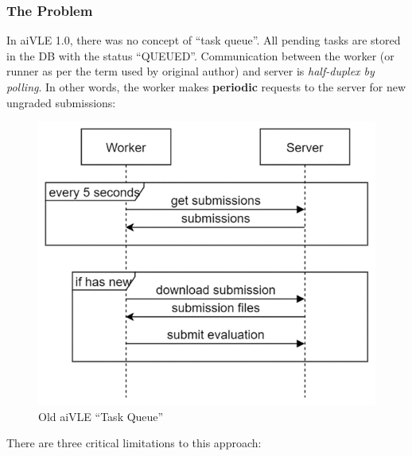 \subsubsection{The Problem}
In aiVLE 1.0, there was no concept of ``task queue''. All pending tasks are stored in the DB with the status ``QUEUED''. Communication between the worker (or runner as per the term used by original author) and server is \textit{half-duplex by polling}. In other words, the worker makes \textbf{periodic} requests to the server for new ungraded submissions:
\begin{figure}[H]
    \centering
    \includegraphics{images/aivle-web-old-task-queue.png}
    \caption{Old aiVLE “Task Queue”}
    \label{fig:aivle-web-old-task-queue}
\end{figure}
There are three critical limitations to this approach:
